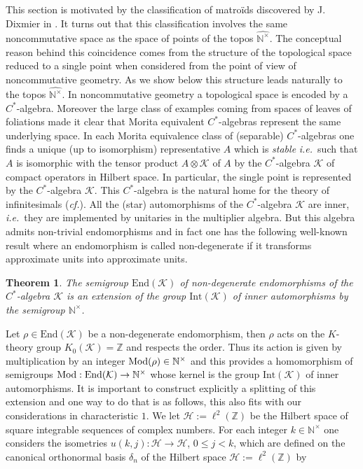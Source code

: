 \documentclass[noams,lp]{compositio}
\newtheorem{thm}{Theorem}[section] %
\def\End{{\rm End}}
\def\mmod{{\rm Mod}}
\def\N{{\mathbb N}}
\def\Z{{\mathbb Z}}
\def\cH{{\mathcal H}}
\def\cK{{\mathcal K}}
\newcommand{\ie}{{\it i.e.\/}\ }
\newcommand{\cf}{{\it cf.}}
\def\End{{\mbox{End}}}
\def\Int{{\mbox{Int}}}
\def\nt{\N^{\times}}
\def\wnt{{\widehat{\N^{\times}}}}
\begin{document}
This section is motivated by the classification of matro\"ids discovered by J. Dixmier in \cite{Dixmier}. It turns out that this classification involves the same noncommutative space as the space of points of the topos $\wnt$. The conceptual reason behind this coincidence comes from the structure of the topological space reduced to a single point when considered from the point of view of noncommutative geometry. As we show below this structure leads naturally to the topos $\wnt$. \newline
In noncommutative geometry a topological space is encoded by a $C^*$-algebra. Moreover  the large class of examples coming from spaces of leaves of foliations made it clear that  Morita equivalent $C^*$-algebras represent the same underlying space. In each Morita equivalence class of (separable) $C^*$-algebras one finds a unique (up to isomorphism) representative $A$ which is {\em stable} \ie  such that $A$ is isomorphic with the tensor product $A\otimes \cK$ of $A$ by the $C^*$-algebra $\cK$ of compact operators in Hilbert space. In particular, the single point is represented by the $C^*$-algebra $\cK$. This $C^*$-algebra is the natural home for the theory of infinitesimals (\cf \cite{NCG}). All the (star) automorphisms of the $C^*$-algebra $\cK$ are inner, \ie they are implemented by unitaries  in the multiplier algebra. But this algebra admits non-trivial endomorphisms and in fact one has  the following well-known result  where an endomorphism is called non-degenerate if it transforms approximate units into approximate units.
\begin{thm}\label{pointstruct} The semigroup $\End(\cK)$ of non-degenerate endomorphisms of the $C^*$-algebra $\cK$ is an extension of the group $\Int(\cK)$ of inner automorphisms by the semigroup $\nt$.
\end{thm}
Let $\rho\in\End(\cK)$ be a non-degenerate endomorphism, then $\rho$ acts on the $K$-theory group $K_0(\cK)=\Z$ and respects the order. Thus its action is given by multiplication by an integer $\mmod(\rho)\in \nt$ and this provides a homomorphism of semigroups $\mmod:\End(\cK)\to \nt$ whose kernel is the group $\Int(\cK)$ of inner automorphisms.
It is important to construct explicitly a splitting of this extension and one way to do that is as follows, this also fits with our considerations in characteristic $1$.  We let $\cH:=\ell^2(\Z)$ be the Hilbert space of square integrable sequences of complex numbers. For each integer $k\in \nt$ one considers the isometries $u(k,j):\cH\to \cH$, $0\leq j<k$, which are defined on the canonical orthonormal basis $\delta_n$ of the Hilbert space $\cH:=\ell^2(\Z)$ by
\end{document}
